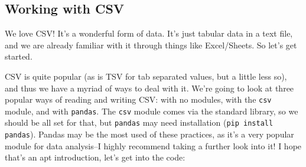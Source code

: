 \documentclass[11pt, twoside, reqno]{book}
\begin{document}
\subsection{Working with CSV}

We love CSV! It's a wonderful form of data. It's just tabular data in a text file, and we are already familiar with it through things like Excel/Sheets. So let's get started.

CSV is quite popular (as is TSV for tab separated values, but a little less so), and thus we have a myriad of ways to deal with it. We're going to look at three popular ways of reading and writing CSV: with no modules, with the \texttt{csv} module, and with \texttt{pandas}. The \texttt{csv} module comes via the standard library, so we should be all set for that, but \texttt{pandas} may need installation (\texttt{pip install pandas}). Pandas may be the most used of these practices, as it's a very popular module for data analysis--I highly recommend taking a further look into it! I hope that's an apt introduction, let's get into the code:
\end{document}
